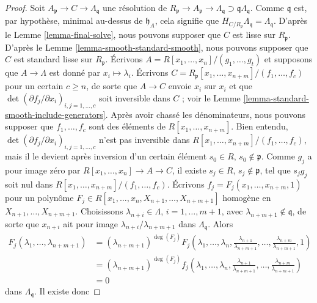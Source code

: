\begin{proof}
Soit $A_\mathfrak p \to C \to \Lambda_\mathfrak q$ une résolution de
$R_\mathfrak p \to A_\mathfrak p \to \Lambda_\mathfrak q
\supset \mathfrak q\Lambda_\mathfrak q$. Comme $\mathfrak q$ est, par hypothèse,
minimal au-dessus de $\mathfrak h_A$, cela
signifie que $H_{C/R_\mathfrak p} \Lambda_\mathfrak q = \Lambda_\mathfrak q$.
D'après le Lemme \ref{lemma-final-solve},
nous pouvons supposer que $C$ est lisse sur $R_\mathfrak p$.
D'après le Lemme \ref{lemma-smooth-standard-smooth}, nous pouvons supposer que
$C$ est standard lisse sur $R_\mathfrak p$.
Écrivons $A = R[x_1, \ldots, x_n]/(g_1, \ldots, g_t)$ et supposons que
$A \to \Lambda$ est donné par $x_i \mapsto \lambda_i$.
Écrivons $C = R_\mathfrak p[x_1, \ldots, x_{n + m}]/(f_1, \ldots, f_c)$
pour un certain $c \geq n$, de sorte que $A \to C$ envoie $x_i$ sur $x_i$ et que
$\det(\partial f_j/\partial x_i)_{i, j = 1, \ldots, c}$
soit inversible dans $C$ ; voir le
Lemme \ref{lemma-standard-smooth-include-generators}.
Après avoir chassé les dénominateurs, nous pouvons supposer que
$f_1, \ldots, f_c$ sont des éléments de $R[x_1, \ldots, x_{n + m}]$.
Bien entendu,
$\det(\partial f_j/\partial x_i)_{i, j = 1, \ldots, c}$
n'est pas inversible dans $R[x_1, \ldots, x_{n + m}]/(f_1, \ldots, f_c)$,
mais il le devient après inversion d'un certain élément $s_0 \in R$,
$s_0 \not \in \mathfrak p$.
Comme $g_j$ a pour image zéro par $R[x_1, \ldots, x_n] \to A \to C$,
il existe $s_j \in R$, $s_j \not \in \mathfrak p$, tel que
$s_j g_j$ soit nul dans $R[x_1, \ldots, x_{n + m}]/(f_1, \ldots, f_c)$.
Écrivons $f_j = F_j(x_1, \ldots, x_{n + m}, 1)$
pour un polynôme
$F_j \in R[x_1, \ldots, x_n, X_{n + 1}, \ldots, X_{n + m + 1}]$
homogène en $X_{n + 1}, \ldots, X_{n + m + 1}$.
Choisissons $\lambda_{n + i} \in \Lambda$, $i = 1, \ldots, m + 1$, avec
$\lambda_{n + m + 1} \not \in \mathfrak q$, de sorte que $x_{n + i}$ ait pour image
$\lambda_{n + i}/\lambda_{n + m + 1}$ dans $\Lambda_\mathfrak q$.
Alors
\begin{align*}
F_j(\lambda_1, \ldots, \lambda_{n + m + 1})
& =
(\lambda_{n + m + 1})^{\deg(F_j)} F_j(\lambda_1, \ldots, \lambda_n,
\frac{\lambda_{n + 1}}{\lambda_{n + m + 1}}, \ldots,
\frac{\lambda_{n + m}}{\lambda_{n + m + 1}}, 1) \\
& =
(\lambda_{n + m + 1})^{\deg(F_j)} f_j(\lambda_1, \ldots, \lambda_n,
\frac{\lambda_{n + 1}}{\lambda_{n + m + 1}}, \ldots,
\frac{\lambda_{n + m}}{\lambda_{n + m + 1}}) \\
& = 0
\end{align*}
dans $\Lambda_\mathfrak q$. Il existe donc

\end{proof}

